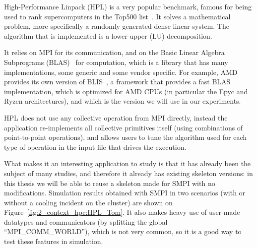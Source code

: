 High-Performance Linpack (HPL) is a very popular benchmark, famous for being
used to rank supercomputers in the Top500 list~\cite{Top500}. It solves a
mathematical problem, more specifically a randomly generated dense linear
system. The algorithm that is implemented is a lower-upper (LU) decomposition.

It relies on MPI for its communication, and on the Basic Linear Algebra
Subprograms (BLAS)~\cite{Lawson1979} for computation, which is a library that
has many implementations, some generic and some vendor specific. For example,
AMD provides its own version of BLIS~\cite{VanZee2015}, a framework that
provides a fast BLAS implementation, which is optimized for AMD CPUs (in
particular the Epyc and Ryzen architectures), and which is the version we will
use in our experiments.

HPL does not use any collective operation from MPI directly, instead the
application re-implements all collective primitives itself (using combinations
of point-to-point operations), and allows users to tune the algorithm used for
each type of operation in the input file that drives the execution.

What makes it an interesting application to study is that it has already been
the subject of many studies, and therefore it already has existing skeleton
versions: in this thesis we will be able to reuse a skeleton made for SMPI with
no modifications. Simulation results obtained with SMPI in two scenarios (with
or without a cooling incident on the cluster) are shown on
Figure~\ref{fig:2_context_hpc:HPL_Tom}. It also makes heavy use of user-made
datatypes and communicators (by splitting the global ``MPI\_COMM\_WORLD''),
which is not very common, so it is a good way to test these features in
simulation.
